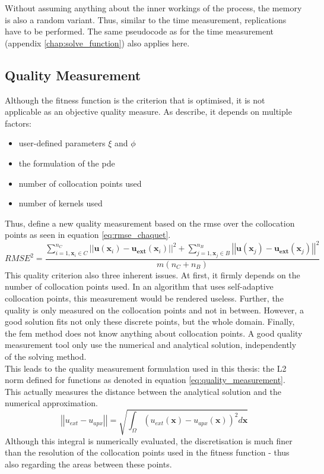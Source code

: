 \documentclass[./\jobname.tex]{subfiles}
\begin{document}
Without assuming anything about the inner workings of the process, the memory is also a random variant. Thus, similar to the time measurement, replications have to be performed. The same pseudocode as for the time measurement (appendix \ref{chap:solve_function}) also applies here.

\subsection{Quality Measurement}
\label{chap:metric_quality}
Although the fitness function is the criterion that is optimised, it is not applicable as an objective quality measure. As \cite{chaquet_using_2019} describe, it depends on multiple factors:
\begin{itemize}
	\item user-defined parameters $\xi$ and $\phi$ 
	\item the formulation of the \gls{pde} 
	\item number of collocation points used 
	\item number of kernels used
\end{itemize}
Thus, \cite{chaquet_using_2019} define a new quality measurement based on the \gls{rmse} over the collocation points as seen in equation \ref{eq:rmse_chaquet}. 
\begin{equation}
\label{eq:rmse_chaquet}
RMSE^2 = \frac{\sum_{i=1, \mathbf{x}_i \in C}^{n_C} \left|\left| \mathbf{u}(\mathbf{x}_i) - \mathbf{u_{ext}}(\mathbf{x}_i) \right|\right|^2 + \sum_{j=1, \mathbf{x}_j \in B}^{n_B} \left|\left| \mathbf{u}(\mathbf{x}_j) - \mathbf{u_{ext}}(\mathbf{x}_j) \right|\right|^2}{m(n_C + n_B)}
\end{equation}
This quality criterion also three inherent issues. At first, it firmly depends on the number of collocation points used. In an algorithm that uses self-adaptive collocation points, this measurement would be rendered useless. Further, the quality is only measured on the collocation points and not in between. However, a good solution fits not only these discrete points, but the whole domain. Finally, the \gls{fem} method does not know anything about collocation points. A good quality measurement tool only use the numerical and analytical solution, independently of the solving method. \\

This leads to the quality measurement formulation used in this thesis: the L2 norm defined for functions as denoted in equation \ref{eq:quality_measurement}. This actually measures the distance between the analytical solution and the numerical approximation.  
\begin{equation}
\label{eq:quality_measurement}
\left|\left|u_{ext} - u_{apx}\right|\right| = \sqrt{\int_{\Omega} (u_{ext}(\mathbf{x}) - u_{apx}(\mathbf{x}))^2 d\mathbf{x}}
\end{equation}
Although this integral is numerically evaluated, the discretisation is much finer than the resolution of the collocation points used in the fitness function - thus also regarding the areas between these points.
\end{document}
